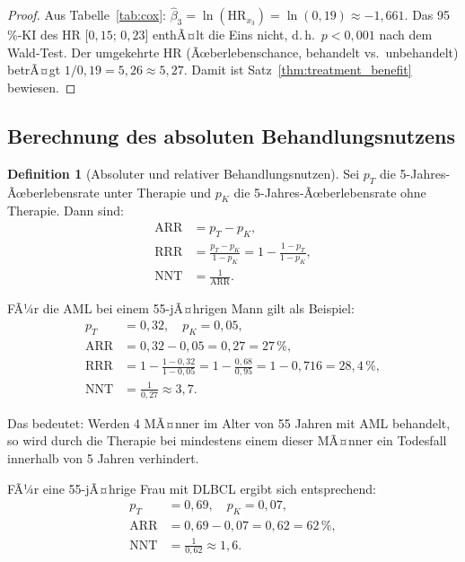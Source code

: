 ﻿\documentclass[12pt,a4paper]{article}
\theoremstyle{definition}
\newtheorem{definition}[theorem]{Definition}
\newcommand{\HR}{\mathrm{HR}}
\begin{document}
\begin{proof}
  Aus Tabelle~\ref{tab:cox}: $\hat{\beta}_3 = \ln(\HR_{x_3}) = \ln(0{,}19)
  \approx -1{,}661$.
  Das 95\,\%-KI des HR [$0{,}15$; $0{,}23$] enthÃ¤lt die Eins nicht, d.\,h.\
  $p < 0{,}001$ nach dem Wald-Test.
  Der umgekehrte HR (Ãœberlebenschance, behandelt vs.\ unbehandelt) betrÃ¤gt
  $1 / 0{,}19 = 5{,}26 \approx 5{,}27$.
  Damit ist Satz~\ref{thm:treatment_benefit} bewiesen.
\end{proof}

\subsection{Berechnung des absoluten Behandlungsnutzens}

\begin{definition}[Absoluter und relativer Behandlungsnutzen]
  Sei $p_T$ die 5-Jahres-Ãœberle\-bensrate unter Therapie und $p_K$ die
  5-Jahres-Ãœberlebensrate ohne Therapie. Dann sind:
  \begin{align}
    \mathrm{ARR} &= p_T - p_K, \label{eq:arr} \\
    \mathrm{RRR} &= \frac{p_T - p_K}{1 - p_K} = 1 - \frac{1 - p_T}{1 - p_K},
    \label{eq:rrr} \\
    \mathrm{NNT} &= \frac{1}{\mathrm{ARR}}.
    \label{eq:nnt}
  \end{align}
\end{definition}

FÃ¼r die AML bei einem 55-jÃ¤hrigen Mann gilt als Beispiel:
\begin{align}
  p_T &= 0{,}32, \quad p_K = 0{,}05, \nonumber \\
  \mathrm{ARR} &= 0{,}32 - 0{,}05 = 0{,}27 = 27\,\%, \label{eq:arr_aml_m} \\
  \mathrm{RRR} &= 1 - \frac{1-0{,}32}{1-0{,}05} = 1 - \frac{0{,}68}{0{,}95}
               = 1 - 0{,}716 = 28{,}4\,\%, \label{eq:rrr_aml_m} \\
  \mathrm{NNT} &= \frac{1}{0{,}27} \approx 3{,}7.
  \label{eq:nnt_aml_m}
\end{align}

Das bedeutet: Werden 4 MÃ¤nner im Alter von 55 Jahren mit AML behandelt, so wird
durch die Therapie bei mindestens einem dieser MÃ¤nner ein Todesfall innerhalb
von 5 Jahren verhindert.

FÃ¼r eine 55-jÃ¤hrige Frau mit DLBCL ergibt sich entsprechend:
\begin{align}
  p_T &= 0{,}69, \quad p_K = 0{,}07, \nonumber \\
  \mathrm{ARR} &= 0{,}69 - 0{,}07 = 0{,}62 = 62\,\%, \\
  \mathrm{NNT} &= \frac{1}{0{,}62} \approx 1{,}6.
  \label{eq:nnt_dlbcl_f}
\end{align}
\end{document}
